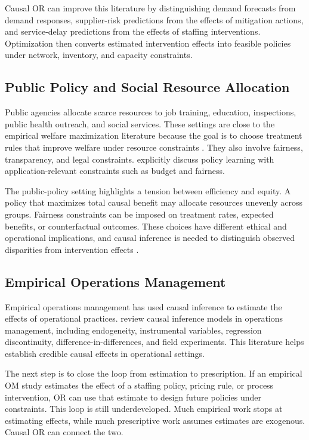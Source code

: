 \documentclass[11pt]{article}
\begin{document}
Causal OR can improve this literature by distinguishing demand forecasts from demand responses, supplier-risk predictions from the effects of mitigation actions, and service-delay predictions from the effects of staffing interventions. Optimization then converts estimated intervention effects into feasible policies under network, inventory, and capacity constraints.

\subsection{Public Policy and Social Resource Allocation}

Public agencies allocate scarce resources to job training, education, inspections, public health outreach, and social services. These settings are close to the empirical welfare maximization literature because the goal is to choose treatment rules that improve welfare under resource constraints \citep{manski2004statistical,kitagawa2018treated}. They also involve fairness, transparency, and legal constraints. \citet{athey2021policy} explicitly discuss policy learning with application-relevant constraints such as budget and fairness.

The public-policy setting highlights a tension between efficiency and equity. A policy that maximizes total causal benefit may allocate resources unevenly across groups. Fairness constraints can be imposed on treatment rates, expected benefits, or counterfactual outcomes. These choices have different ethical and operational implications, and causal inference is needed to distinguish observed disparities from intervention effects \citep{athey2021policy,hernan2020causal}.

\subsection{Empirical Operations Management}

Empirical operations management has used causal inference to estimate the effects of operational practices. \citet{ho2017causal} review causal inference models in operations management, including endogeneity, instrumental variables, regression discontinuity, difference-in-differences, and field experiments. This literature helps establish credible causal effects in operational settings.

The next step is to close the loop from estimation to prescription. If an empirical OM study estimates the effect of a staffing policy, pricing rule, or process intervention, OR can use that estimate to design future policies under constraints. This loop is still underdeveloped. Much empirical work stops at estimating effects, while much prescriptive work assumes estimates are exogenous. Causal OR can connect the two.
\end{document}
